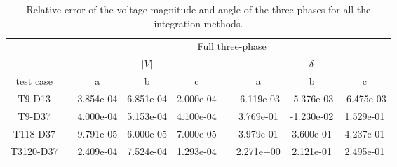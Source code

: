 \begin{table}[h]
\renewcommand{\arraystretch}{1.3}
\centering
\caption{Relative error of the voltage magnitude and angle of the three phases for all the integration methods. }\label{tab:relerror}
\begin{adjustbox}{width=1\textwidth} %
\small
\begin{tabular}{ccccccccc}
\toprule
{} && \multicolumn{7}{c}{Full three-phase}   \\
\cmidrule{3-9}
{} && \multicolumn{3}{c}{$|V|$} && \multicolumn{3}{c}{$\delta$}  \\
\cmidrule{3-5}\cmidrule{7-9}
 test case &&        a &        b &       c &&        a &       b &        c \\
\midrule
T9-D13    &&  3.854e-04 &  6.851e-04 &  2.000e-04 &&  -6.119e-03 &  -5.376e-03 &  -6.475e-03 \\
T9-D37    &&  4.000e-04 &  5.153e-04 &  4.100e-04 &&   3.769e-01 &  -1.230e-02 &   1.529e-01 \\
T118-D37  &&  9.791e-05 &  6.000e-05 &  7.000e-05 &&   3.979e-01 &   3.600e-01 &   4.237e-01 \\
T3120-D37 &&  2.409e-04 &  7.524e-04 &  1.293e-04 &&   2.271e+00 &   2.121e-01 &   2.495e-01 \\
\bottomrule
\end{tabular}
\end{adjustbox}


\end{table}
